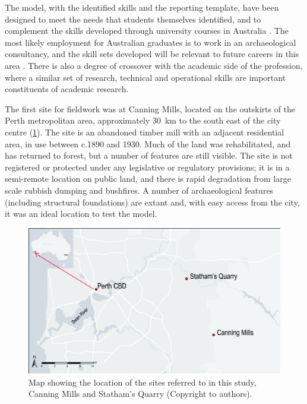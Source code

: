 \documentclass[%
]{ijsra}
\begin{document}
	The model, with the identified skills and the reporting template, have been designed to meet the needs that students themselves identified, and to complement the skills developed through university courses in Australia \parencite[3]{beck2008}. 
	The most likely employment for Australian graduates is to work in an archaeological consultancy, and the skill sets developed will be relevant to future careers in this area \parencites[e.g.][]{ireland2013}{ulm2005}{ulm2013}. 
	There is also a degree of crossover with the academic side of the profession, where a similar set of research, technical and operational skills are important constituents of academic research.
	
	
	The first site for fieldwork was at Canning Mills, located on the outskirts of the Perth metropolitan area, approximately \SI {30}{\kilo\meter} 
	to the south east of the city centre (\cref{fig:Fyfe-Figure01}). 
	The site is an abandoned timber mill with an adjacent residential area, in use between c.1890 and 1930. 
	Much of the land was rehabilitated, and has returned to forest, but a number of features are still visible. The site is not registered or protected under any legislative or regulatory provisions; it is in a semi-remote location on public land, and there is rapid degradation from large scale rubbish dumping and bushfires. A number of archaeological features (including structural foundations) are extant and, with easy access from the city, it was an ideal location to test the model.
	
	\begin{figure} %
		\includegraphics[width=\linewidth]{figures/Fyfe-Figure01}
		\caption{Map showing the location of the sites referred to in this study, Canning Mills and Statham’s Quarry (Copyright to authors).}
		\centering
		\label{fig:Fyfe-Figure01}
	\end{figure}
	
\end{document}
